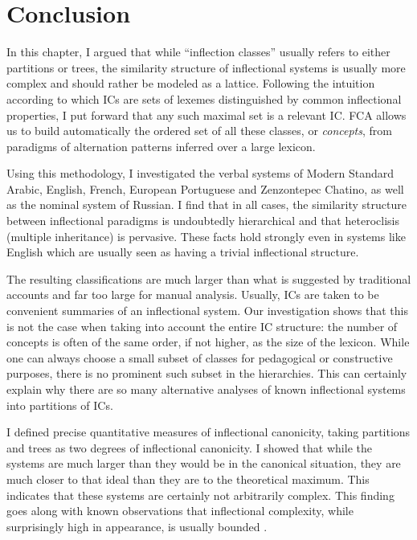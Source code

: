 \documentclass[output=paper]{langscibook}
\begin{document}
    \section{Conclusion}
    \label{Conclusion:beniamine}
    
    In this chapter, I argued that while ``inflection classes'' usually refers to either partitions or trees, the similarity structure of inflectional systems is usually more complex and should rather be modeled as a lattice. Following the intuition according to which ICs are sets of lexemes distinguished by common inflectional properties, I put forward that any such maximal set is a relevant IC. FCA allows us to build automatically the ordered set of all these classes, or \textit{concepts}, from paradigms of alternation patterns inferred over a large lexicon. 
    
    Using this methodology, I investigated the verbal systems of Modern Standard Arabic, English, French, European Portuguese and Zenzontepec Chatino, as well as the nominal system of Russian. I find that in all cases, the similarity structure between inflectional paradigms is undoubtedly hierarchical and that heteroclisis (multiple inheritance) is pervasive. These facts hold strongly even in systems like English which are usually seen as having a trivial inflectional structure. 
    
    The resulting classifications are much larger than what is suggested by traditional accounts and far too large for manual analysis. Usually, ICs are  taken to be convenient summaries of an inflectional system. Our investigation shows that this is not the case when taking into account the entire IC structure: the number of concepts is often of the same order, if not higher, as the size of the lexicon. While one can always choose a small subset of classes for pedagogical or constructive purposes, there is no prominent such subset in the hierarchies. This can certainly explain why there are so many alternative analyses of known inflectional systems into partitions of ICs.
    
    I defined precise quantitative measures of inflectional canonicity, taking partitions and trees as two degrees of inflectional canonicity. I showed that while the systems are much larger than they would be in the canonical situation, they are much closer to that ideal than they are to the theoretical maximum. This indicates that these systems are certainly not arbitrarily complex. This finding goes along with known observations that inflectional complexity, while surprisingly high in appearance, is usually bounded \citep{Carstairs1987,Carstairs-McCarthy1991,AckermanBlevinsMalouf2009,AckermanMalouf2015}. 
    
\end{document}
